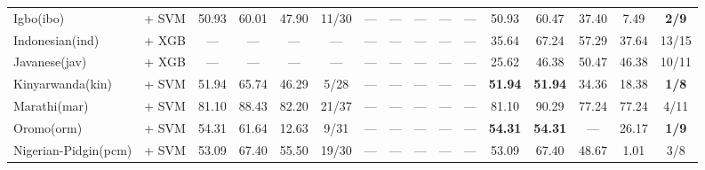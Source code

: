 \begin{table*}[h]
{\begin{tabular}{l|c|cccc|ccccc|ccccc}
            Igbo(ibo)              & \citep{wang2024multilingual}   + SVM                                   & 50.93                        & 60.01                        & 47.90                       & 11/30         & —             & —            & —              & —             & —             & 50.93          & 60.47          & 37.40          & 7.49          & \textbf{2/9}  \\
            Indonesian(ind)        & \citep{wang2024multilingual}   + XGB                                   & —                            & —                            & —                           & —             & —             & —            & —              & —             & —             & 35.64          & 67.24          & 57.29          & 37.64         & 13/15         \\
            Javanese(jav)          & \citep{wang2024multilingual}   + XGB                                   & —                            & —                            & —                           & —             & —             & —            & —              & —             & —             & 25.62          & 46.38          & 50.47          & 46.38         & 10/11         \\
            Kinyarwanda(kin)       & \citep{wang2024multilingual}  + SVM                                    & 51.94                        & 65.74                        & 46.29                       & 5/28          & —             & —            & —              & —             & —             & \textbf{51.94} & \textbf{51.94} & 34.36          & 18.38         & \textbf{1/8}  \\
            Marathi(mar)           & \citep{wang2024multilingual}   + SVM                                   & 81.10                        & 88.43                        & 82.20                       & 21/37         & —             & —            & —              & —             & —             & 81.10          & 90.29          & 77.24          & 77.24         & 4/11          \\
            Oromo(orm)             & \citep{wang2024multilingual}    + SVM                                  & 54.31                        & 61.64                        & 12.63                       & 9/31          & —             & —            & —              & —             & —             & \textbf{54.31} & \textbf{54.31} & —              & 26.17         & \textbf{1/9}  \\
            Nigerian-Pidgin(pcm)   & \citep{wang2024multilingual}   + SVM                                   & 53.09                        & 67.40                        & 55.50                       & 19/30         & —             & —            & —              & —             & —             & 53.09          & 67.40          & 48.67          & 1.01          & 3/8           \\

\end{tabular}}
\end{table*}

